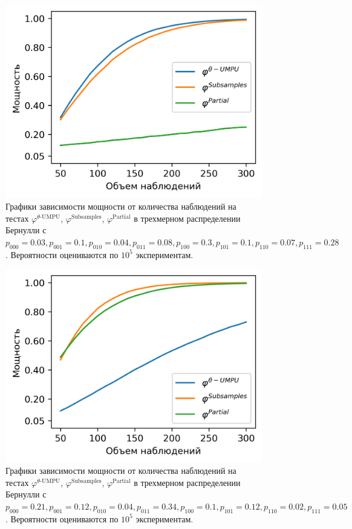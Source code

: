 \begin{figure}[H]
    \centering
    \includegraphics[scale=0.8]{images/graph6.png}
    \caption{Графики зависимости мощности от количества наблюдений
    на тестах $\varphi^{\text{$\theta$-UMPU}}$, $\varphi^{\text{Subsamples}}$, $\varphi^{\text{Partial}}$
    в трехмерном распределении Бернулли с $p_{000}=0.03, p_{001}=0.1, 
    p_{010}=0.04, p_{011}=0.08,
    p_{100}=0.3, p_{101}=0.1, p_{110}=0.07, p_{111}=0.28$. Вероятности оцениваются по $10^5$ экспериментам.} \label{fig:6}
\end{figure}

\begin{figure}[H]
    \centering
    \includegraphics[scale=0.8]{images/graph7.png}
    \caption{Графики зависимости мощности от количества наблюдений
    на тестах $\varphi^{\text{$\theta$-UMPU}}$, $\varphi^{\text{Subsamples}}$, $\varphi^{\text{Partial}}$
    в трехмерном распределении Бернулли с $p_{000}=0.21, p_{001}=0.12, 
    p_{010}=0.04, p_{011}=0.34,
    p_{100}=0.1, p_{101}=0.12, p_{110}=0.02, p_{111}=0.05$. Вероятности оцениваются по $10^5$ экспериментам.} \label{fig:7}
\end{figure}
